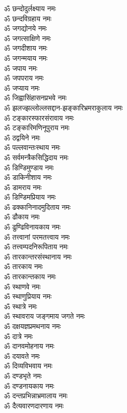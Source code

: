 \begin{multicols}{2}
\begin{flushleft}
ॐ छन्दोदुर्लक्ष्याय नमः\\
ॐ छन्दविग्रहाय नमः\\
ॐ जगद्योनये नमः\\
ॐ जगत्साक्षिणे नमः\\
ॐ जगदीशाय नमः\\
ॐ जगन्मयाय नमः\\
ॐ जपाय नमः\\
ॐ जपपराय नमः\hfill{}\\
ॐ जप्याय नमः\\
ॐ जिह्वासिंहासनप्रभवे नमः\\
ॐ झलज्झल्लोल्लसद्दान-झङ्कारिभ्रमराकुलाय नमः\\
ॐ टङ्कारस्फारसंरावाय नमः\\
ॐ टङ्कारिमणिनूपुराय नमः\\
ॐ ठद्वयिने नमः\\
ॐ पल्लवान्तःस्थाय नमः\\
ॐ सर्वमन्त्रैकसिद्धिदाय नमः\\
ॐ डिण्डिमुण्डाय नमः\\
ॐ डाकिनीशाय नमः\hfill{}\\
ॐ डामराय नमः\\
ॐ डिण्डिमप्रियाय नमः\\
ॐ ढक्कानिनादमुदिताय नमः\\
ॐ ढौकाय नमः\\
ॐ ढुण्ढिविनायकाय नमः\\
ॐ तत्त्वानां परमतत्त्वाय नमः\\
ॐ तत्त्वम्पदनिरूपिताय नमः\\
ॐ तारकान्तरसंस्थानाय नमः\\
ॐ तारकाय नमः\\
ॐ तारकान्तकाय नमः\hfill{}\\
ॐ स्थाणवे नमः\\
ॐ स्थाणुप्रियाय नमः\\
ॐ स्थात्रे नमः\\
ॐ स्थावराय जङ्गमाय जगते नमः\\
ॐ दक्षयज्ञप्रमथनाय नमः\\
ॐ दात्रे नमः\\
ॐ दानवमोहनाय नमः\\
ॐ दयावते नमः\\
ॐ दिव्यविभवाय नमः\\
ॐ दण्डभृते नमः\hfill{}\\
ॐ दण्डनायकाय नमः\\
ॐ दन्तप्रभिन्नाभ्रमालाय नमः\\
ॐ दैत्यवारणदारणाय नमः\\

\end{flushleft}
\end{multicols}
